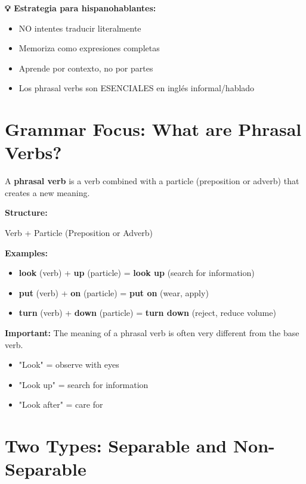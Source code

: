 \begin{comparisonbox}[title=🇪🇸 Phrasal Verbs: NO existen en español - Pesadilla para hispanohablantes]
\textbf{💡 Estrategia para hispanohablantes:}
\begin{itemize}
    \item NO intentes traducir literalmente
    \item Memoriza como expresiones completas
    \item Aprende por contexto, no por partes
    \item Los phrasal verbs son ESENCIALES en inglés informal/hablado
\end{itemize}
\end{comparisonbox}

\section{Grammar Focus: What are Phrasal Verbs?}

\begin{grammarbox}[title=Definition and Structure]
A \textbf{phrasal verb} is a verb combined with a particle (preposition or adverb) that creates a new meaning.

\textbf{Structure:}
\begin{center}
Verb + Particle (Preposition or Adverb)
\end{center}

\textbf{Examples:}
\begin{itemize}
    \item \textbf{look} (verb) + \textbf{up} (particle) = \textbf{look up} (search for information)
    \item \textbf{put} (verb) + \textbf{on} (particle) = \textbf{put on} (wear, apply)
    \item \textbf{turn} (verb) + \textbf{down} (particle) = \textbf{turn down} (reject, reduce volume)
\end{itemize}

\textbf{Important:} The meaning of a phrasal verb is often very different from the base verb.
\begin{itemize}
    \item "Look" = observe with eyes
    \item "Look up" = search for information
    \item "Look after" = care for
\end{itemize}
\end{grammarbox}

\section{Two Types: Separable and Non-Separable}

